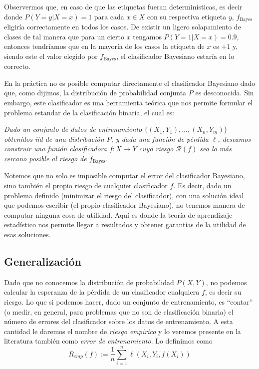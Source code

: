 \documentclass{article}
\begin{document}
Observermos que, en caso de que las etiquetas fueran determinísticas, es decir donde $P(Y=y|X=x)=1$ para cada $x\in X$ con su
respectiva etiqueta $y$, $f_{\text{Bayes}}$ eligiría correctamente en todos los casos. De existir un ligero solapamiento de clases 
de tal manera que para un cierto $x$ tengamos $P(Y=1|X=x) = 0.9$, entonces tendríamos
que en la mayoría de los casos la etiqueta de $x$ es $+1$ y, siendo este el valor elegido por $f_{\text{Bayes}}$, el clasificador
Bayesiano estaría en lo correcto.

En la práctica no es posible computar directamente el clasificador Bayesiano dado que, como dijimos, la distribución de probabilidad
conjunta $P$ es desconocida. Sin embargo, este clasificador es una herramienta teórica que nos permite formular el problema
estandar de la clasificación binaria, el cual es:

\textit{Dado un conjunto de datos de entrenamiento $ \{ (X_1,Y_1),\dots,(X_n, Y_m)\}$ obtenidos iid de una distribución $P$, y dada una
función de pérdida $\ell$, deseamos construir una funión clasificadora $f:X\rightarrow Y$ cuyo riesgo $\mathcal{R}(f)$ sea lo
más cercano posible al riesgo de $f_{\text{Bayes}}$.}

Notemos que no solo es imposible computar el error del clasificador Bayesiano, sino también el propio riesgo de cualquier clasificador
$f$. Es decir, dado un problema definido (minimizar el riesgo del clasificador), con una solución ideal que podemos escribir (el propio
clasificador Bayesiano), no tenemos manera de computar ninguna cosa de utilidad. Aquí es donde la teoría de aprendizaje estadístico
nos permite llegar a resultados y obtener garantías de la utilidad de esas soluciones.

\subsection{Generalización}

Dado que no conocemos la distribución de probabilidad $P(X,Y)$, no podemos calcular la esperanza de la pérdida de un clasificador cualquiera
$f$, es decir su riesgo. Lo que si podemos hacer, dado un conjunto de entrenamiento, es ``contar'' (o medir, en general, para problemas
que no son de clasificación binaria) el número de errores del clasificador sobre los datos de entrenamiento. A esta cantidad le daremos
el nombre de \textit{riesgo empírico} y lo veremos presente en la literatura también como \textit{error de entrenamiento}. Lo definimos
como
\[
R_{emp}(f) := \frac{1}{n} \sum_{i=1}^n \ell(X_i,Y_i,f(X_i))
\]
\end{document}
